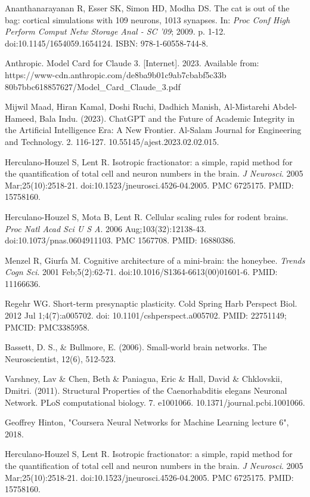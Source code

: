 \documentclass{article}
\begin{document}
\begin{multicols}{2}
\begin{thebibliography}{11}
Ananthanarayanan R, Esser SK, Simon HD, Modha DS. 
The cat is out of the bag: cortical simulations with 109 neurons, 1013 synapses. 
In: \textit{Proc Conf High Perform Comput Netw Storage Anal - SC '09}; 2009. p. 1-12. 
doi:10.1145/1654059.1654124. ISBN: 978-1-60558-744-8.

Anthropic. 
Model Card for Claude 3. [Internet]. 2023. 
Available from: https://www-cdn.anthropic.com/de8ba9b01c9ab7cbabf5c33b 80b7bbc618857627/Model\_Card\_Claude\_3.pdf

 Mijwil Maad, Hiran Kamal, Doshi Ruchi, Dadhich Manish, Al-Mistarehi Abdel-Hameed, Bala Indu. (2023). ChatGPT and the Future of Academic Integrity in the Artificial Intelligence Era: A New Frontier. Al-Salam Journal for Engineering and Technology. 2. 116-127. 10.55145/ajest.2023.02.02.015.

Herculano-Houzel S, Lent R. 
Isotropic fractionator: a simple, rapid method for the quantification of total cell and neuron numbers in the brain. 
\textit{J Neurosci}. 2005 Mar;25(10):2518-21. 
doi:10.1523/jneurosci.4526-04.2005. PMC 6725175. PMID: 15758160.

Herculano-Houzel S, Mota B, Lent R. 
Cellular scaling rules for rodent brains. 
\textit{Proc Natl Acad Sci U S A}. 2006 Aug;103(32):12138-43. 
doi:10.1073/pnas.0604911103. PMC 1567708. PMID: 16880386.

Menzel R, Giurfa M. 
Cognitive architecture of a mini-brain: the honeybee. 
\textit{Trends Cogn Sci}. 2001 Feb;5(2):62-71. 
doi:10.1016/S1364-6613(00)01601-6. PMID: 11166636.

Regehr WG. Short-term presynaptic plasticity. Cold Spring Harb Perspect Biol. 2012 Jul 1;4(7):a005702. doi: 10.1101/cshperspect.a005702. PMID: 22751149; PMCID: PMC3385958.

Bassett, D. S., \& Bullmore, E. (2006). Small-world brain networks. The Neuroscientist, 12(6), 512-523.

Varshney, Lav \& Chen, Beth \& Paniagua, Eric \& Hall, David \& Chklovskii, Dmitri. (2011). Structural Properties of the Caenorhabditis elegans Neuronal Network. PLoS computational biology. 7. e1001066. 10.1371/journal.pcbi.1001066. 

Geoffrey Hinton, "Coursera Neural Networks for Machine Learning lecture 6", 2018.

Herculano-Houzel S, Lent R. 
Isotropic fractionator: a simple, rapid method for the quantification of total cell and neuron numbers in the brain. 
\textit{J Neurosci}. 2005 Mar;25(10):2518-21. 
doi:10.1523/jneurosci.4526-04.2005. PMC 6725175. PMID: 15758160.


\end{thebibliography}
\end{multicols}
\end{document}
